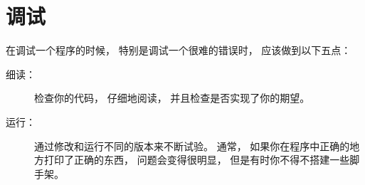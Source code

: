 {%
\section{调试}

在调试一个程序的时候， 特别是调试一个很难的错误时， 应该做到以下五点：


\begin{description}

\item [细读：]检查你的代码， 仔细地阅读， 并且检查是否实现了你的期望。  

\item [运行：]通过修改和运行不同的版本来不断试验。    通常， 如果你在程序中正确的地方打印了正确的东西， 问题会变得很明显， 但是有时你不得不搭建一些脚手架。  


\end{description}}
